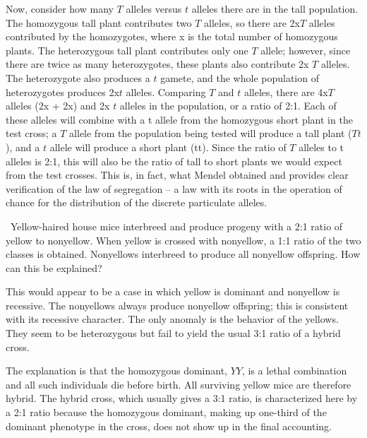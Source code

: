 \documentclass[hw,addpoints,noanswers]{exam}
\begin{document}
\begin{questions}
\begin{solution}
Now, consider how many $T$ alleles versus $t$ alleles there are in the tall population. The homozygous tall plant contributes two $T$ alleles, so there are 2x$T$ alleles contributed by the homozygotes, where x is the total number of homozygous plants. The heterozygous tall plant contributes only one $T$ allele; however, since there are twice as many heterozygotes, these plants also contribute 2x $T$ alleles. The heterozygote also produces a $t$ gamete, and the whole population of heterozygotes produces 2x$t$ alleles. Comparing $T$ and $t$ alleles, there are 4x$T$ alleles (2x + 2x) and 2x $t$ alleles in the population, or a ratio of 2:1. Each of these alleles will combine with a t allele from the homozygous short plant in the test cross; a $T$ allele from the population being tested will produce a tall plant ($Tt$), and a $t$ allele will produce a short plant (tt). Since the ratio of $T$ alleles to t alleles is 2:1, this will also be the ratio of tall to short plants we would expect from the test crosses. This is, in fact, what Mendel obtained and provides clear verification of the law of segregation -- a law with its roots in the operation of chance for the distribution of the discrete particulate alleles.
\end{solution}

\question Yellow-haired house mice interbreed and produce progeny with a 2:1 ratio of yellow to nonyellow. When yellow is crossed with nonyellow, a 1:1 ratio of the two classes is obtained. Nonyellows interbreed to produce all nonyellow offspring. How can this be explained?
\begin{solution}
This would appear to be a case in which yellow is dominant and nonyellow is recessive. The nonyellows always produce nonyellow offspring; this is consistent with its recessive character. The only anomaly is the behavior of the yellows. They seem to be heterozygous but fail to yield the usual 3:1 ratio of a hybrid cross.

The explanation is that the homozygous dominant, $YY$, is a lethal combination and all such individuals die before birth. All surviving yellow mice are therefore hybrid. The hybrid cross, which usually gives a 3:1 ratio, is characterized here by a 2:1 ratio because the homozygous dominant, making up one-third of the dominant phenotype in the cross, does not show up in the final accounting.
\end{solution}




\end{questions}
\end{document}
